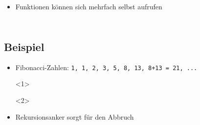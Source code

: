 \begin{frame}[t]
    \slidehead

    \begin{itemize}
        \item Funktionen können sich mehrfach selbst aufrufen
    \end{itemize}

    \begin{columns}
        \begin{column}{5cm}
            \begin{figure}
            \end{figure}
        \end{column}

        \begin{column}{5cm}
            \begin{figure}
            \end{figure}
        \end{column}
    \end{columns}
\end{frame}

\subsection*{Beispiel}
\begin{frame}
    \slidehead

    \begin{itemize}
        \item Fibonacci-Zahlen: \texttt{1, 1, 2, 3, 5, 8, 13, 8+13 = 21, ...}
            \begin{onlyenv}<1>
            \end{onlyenv}

            \begin{onlyenv}<2>
            \end{onlyenv}

        \item<2> Rekursionsanker sorgt für den Abbruch
    \end{itemize}

\end{frame}

